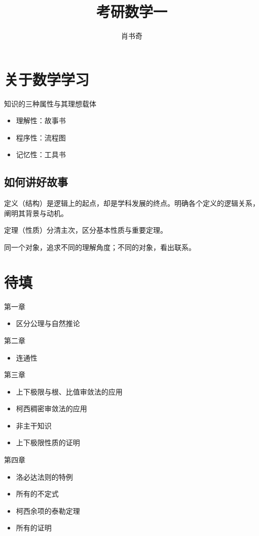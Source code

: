 \documentclass{tufte-book}
\title{考研数学一}
\author{肖书奇}
\begin{document}
\frontmatter%
\maketitle
\tableofcontents%

\chapter*{关于数学学习}
知识的三种属性与其理想载体
\begin{itemize}
    \item 理解性：故事书
    \item 程序性：流程图
    \item 记忆性：工具书
\end{itemize}
\section{如何讲好故事}
\par 定义（结构）是逻辑上的起点，却是学科发展的终点。明确各个定义的逻辑关系，阐明其背景与动机。
\par 定理（性质）分清主次，区分基本性质与重要定理。
\par 同一个对象，追求不同的理解角度；不同的对象，看出联系。

\chapter*{待填}
\par 第一章
\begin{itemize}
    \item 区分公理与自然推论
\end{itemize}
\par 第二章
\begin{itemize}
    \item 连通性
\end{itemize}
\par 第三章
\begin{itemize}
    \item 上下极限与根、比值审敛法的应用
    \item 柯西稠密审敛法的应用
    \item 非主干知识
    \item 上下极限性质的证明
\end{itemize}
\par 第四章
\begin{itemize}
    \item 洛必达法则的特例
    \item 所有的不定式
    \item 柯西余项的泰勒定理
    \item 所有的证明
\end{itemize}
\mainmatter
\end{document}

